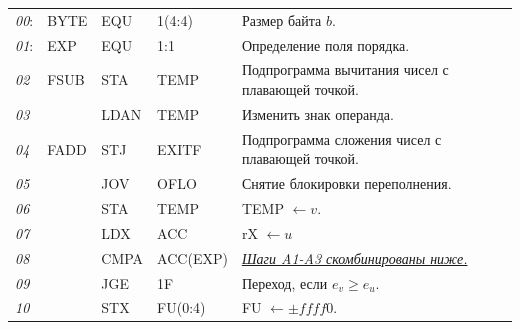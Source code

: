 {\begin{longtable}{l l l l l}
\textit{00}: & BYTE & EQU & 1(4:4) & Размер байта $b$.\\
\textit{01}: & EXP & EQU & 1:1 & Определение поля порядка.\\
\textit{02} & FSUB & STA & TEMP &	Подпрограмма вычитания чисел с плавающей точкой.\\
\textit{03} & & LDAN & TEMP & Изменить знак операнда.\\
\textit{04} & FADD & STJ & EXITF &	Подпрограмма сложения чисел с плавающей точкой.\\
\textit{05}	& & JOV & OFLO & Снятие блокировки переполнения.\\
\textit{06}	& & STA & TEMP & TEMP $\leftarrow v$.\\
\textit{07}	& & LDX & ACC & rX $\leftarrow u$\\
\textit{08}	& & CMPA & ACC(EXP)	& \underline{\textit{Шаги A1-A3 скомбинированы ниже.}}\\
\textit{09}	& & JGE & 1F & Переход, если $e_v \geq e_u$.\\
\textit{10}	& & STX & FU(0:4) & FU $\leftarrow \pm f f f f 0$.\\


\end{longtable}}
